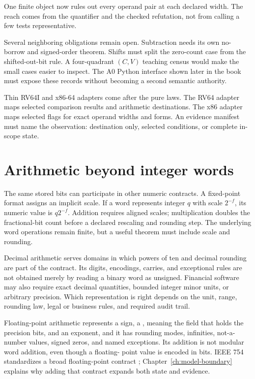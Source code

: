 One finite object now rules out every operand pair at each declared width. The
reach comes from the quantifier and the checked refutation, not from calling a
few tests representative.

Several neighboring obligations remain open. Subtraction needs its own
no-borrow and signed-order theorem. Shifts must split the zero-count case from
the shifted-out-bit rule. A four-quadrant \((C,V)\) teaching census would make
the small cases easier to inspect. The A0 Python interface shown later in the
book must expose these records without becoming a second semantic authority.

Thin RV64I and x86-64 adapters come after the pure laws. The RV64 adapter maps
selected comparison results and arithmetic destinations. The x86 adapter maps
selected flags for exact operand widths and forms. An evidence manifest must
name the observation: destination only, selected conditions, or complete
in-scope state.

\section{Arithmetic beyond integer words}

The same stored bits can participate in other numeric contracts. A fixed-point
format assigns an implicit scale. If a word represents integer \(q\) with
scale \(2^{-f}\), its numeric value is \(q2^{-f}\). Addition requires aligned
scales; multiplication doubles the fractional-bit count before a declared
rescaling and rounding step. The underlying word operations remain finite,
but a useful theorem must include scale and rounding.

Decimal arithmetic serves domains in which powers of ten and decimal rounding
are part of the contract. Its digits, encodings, carries, and exceptional
rules are not obtained merely by reading a binary word as unsigned. Financial
software may also require exact decimal quantities, bounded integer minor
units, or arbitrary precision. Which representation is right depends on the
unit, range, rounding law, legal or business rules, and required audit trail.

Floating-point arithmetic represents a sign, a , meaning
the field that holds the precision bits, and an exponent, and it
has rounding modes, infinities, not-a-number values, signed zeros, and named
exceptions. Its addition is not modular word addition, even though a floating-
point value is encoded in bits. IEEE 754 standardizes a broad floating-point
contract \autocite{ieee7542019}; Chapter~\ref{ch:model-boundary} explains why
adding that contract expands both state and evidence.

